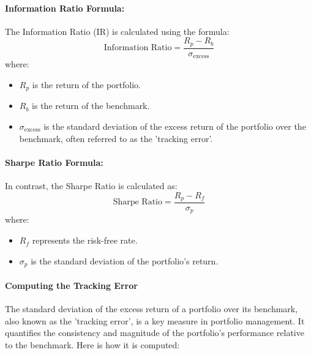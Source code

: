 \documentclass{article}
\begin{document}
\paragraph{Information Ratio Formula:}
The Information Ratio (IR) is calculated using the formula:
\begin{equation}
    \text{Information Ratio} = \frac{R_p - R_b}{\sigma_{\text{excess}}}
\end{equation}
where:
\begin{itemize}
    \item \( R_p \) is the return of the portfolio.
    \item \( R_b \) is the return of the benchmark.
    \item \( \sigma_{\text{excess}} \) is the standard deviation of the excess return of the portfolio over the benchmark, often referred to as the 'tracking error'.
\end{itemize}

\paragraph{Sharpe Ratio Formula:}
In contrast, the Sharpe Ratio is calculated as:
\begin{equation}
    \text{Sharpe Ratio} = \frac{R_p - R_f}{\sigma_p}
\end{equation}
where:
\begin{itemize}
    \item \( R_f \) represents the risk-free rate.
    \item \( \sigma_p \) is the standard deviation of the portfolio’s return.
\end{itemize}

\paragraph{Computing the Tracking Error}

The standard deviation of the excess return of a portfolio over its benchmark, also known as the 'tracking error', is a key measure in portfolio management. It quantifies the consistency and magnitude of the portfolio's performance relative to the benchmark. Here is how it is computed:
\end{document}
